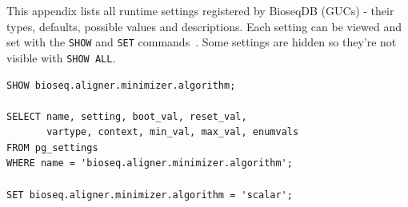 \label{sec:appendix-configuration}
\label{sec:configuration-reference}
\label{app:configuration-reference}

This appendix lists all runtime settings registered by BioseqDB (GUCs) - their types, defaults, possible values and descriptions.
Each setting can be viewed and set with the \texttt{SHOW} and \texttt{SET} commands~\autocite{postgresql17_pg_settings,postgresql17_guc_functions}.
Some settings are hidden so they're not visible with \texttt{SHOW ALL}.

\begin{lstlisting}[style=bioseq-search-sql,
  caption={Inspecting and settingBioseqDB config values},
  label={lst:configuration-inspect}]
SHOW bioseq.aligner.minimizer.algorithm;

SELECT name, setting, boot_val, reset_val,
       vartype, context, min_val, max_val, enumvals
FROM pg_settings
WHERE name = 'bioseq.aligner.minimizer.algorithm';

SET bioseq.aligner.minimizer.algorithm = 'scalar';
\end{lstlisting}


